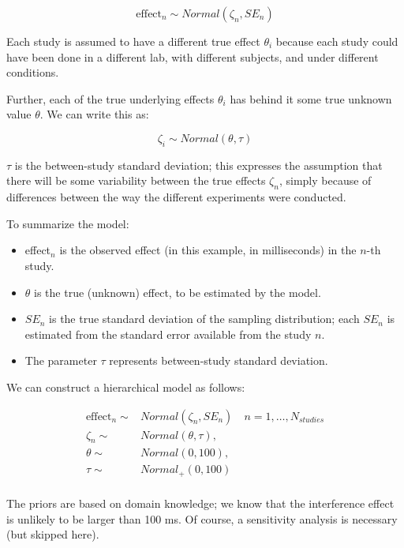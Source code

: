 \documentclass[12pt,]{krantz}
\providecommand{\tightlist}{%
  \setlength{\itemsep}{0pt}\setlength{\parskip}{0pt}}
\theoremstyle{definition}
\theoremstyle{definition}
\theoremstyle{definition}
\theoremstyle{remark}
\begin{document}
\begin{equation}
\text{effect}_n \sim Normal(\zeta_n,SE_n)
\end{equation}

Each study is assumed to have a different true effect \(\theta_i\)
because each study could have been done in a different lab, with
different subjects, and under different conditions.

Further, each of the true underlying effects \(\theta_i\) has behind it
some true unknown value \(\theta\). We can write this as:

\begin{equation}
\zeta_i \sim Normal(\theta,\tau)
\end{equation}

\(\tau\) is the between-study standard deviation; this expresses the
assumption that there will be some variability between the true effects
\(\zeta_n\), simply because of differences between the way the different
experiments were conducted.

To summarize the model:

\begin{itemize}
\tightlist
\item
  effect\(_n\) is the observed effect (in this example, in milliseconds)
  in the \(n\)-th study.
\item
  \(\theta\) is the true (unknown) effect, to be estimated by the model.
\item
  \(SE_{n}\) is the true standard deviation of the sampling
  distribution; each \(SE_n\) is estimated from the standard error
  available from the study \(n\).
\item
  The parameter \(\tau\) represents between-study standard deviation.
\end{itemize}

We can construct a hierarchical model as follows:

\begin{equation}
\begin{split}
\text{effect}_n \sim & Normal(\zeta_n, SE_n) \quad n=1,\dots, N_{studies}\\
\zeta_n \sim & Normal(\theta, \tau), \\
\theta \sim & Normal(0,100),\\
 \tau \sim & Normal_+(0,100) \\
\end{split}
\end{equation}

The priors are based on domain knowledge; we know that the interference
effect is unlikely to be larger than 100 ms. Of course, a sensitivity
analysis is necessary (but skipped here).
\end{document}
